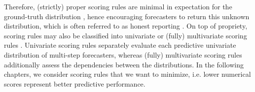 \documentclass[a4paper,oneside,bibliography=totoc]{scrbook}
\begin{document}
Therefore, (strictly) proper scoring rules are minimal in expectation for the ground-truth distribution \cite{marcotte_regions_2023}, hence encouraging forecasters to return this unknown distribution, which is often referred to as honest reporting \cite{winkler_scoring_1996, winkler_good_1968}.
On top of propriety, scoring rules may also be classified into univariate or (fully) multivariate scoring rules \cite{ziel_multivariate_2019}. Univariate scoring rules separately evaluate each predictive univariate distribution of multi-step forecasters, whereas (fully) multivariate scoring rules additionally assess the dependencies between the distributions. 
In the following chapters, we consider scoring rules that we want to minimize, i.e. lower numerical scores represent better predictive performance.
\newline
\end{document}
